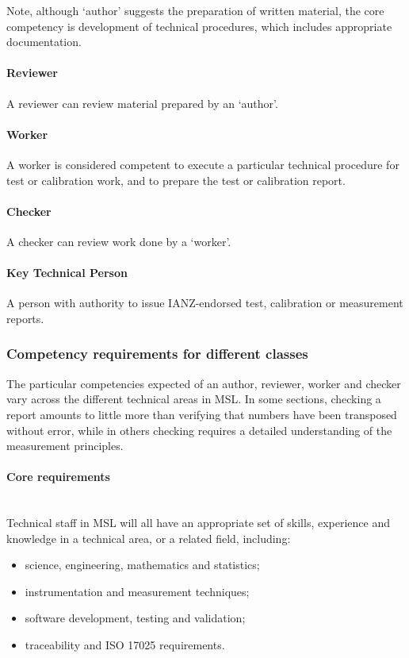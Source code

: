 Note, although ‘author' suggests the preparation of written material, the core competency is development of technical procedures, which includes appropriate documentation.

\paragraph{Reviewer}
A reviewer can review material prepared by an ‘author'. 

\paragraph{Worker}
A worker is considered competent to execute a particular technical procedure for test or calibration work, and to prepare the test or calibration report.

\paragraph{Checker}
A checker can review work done by a ‘worker'.

\paragraph{Key Technical Person}
A person with authority to issue IANZ-endorsed test, calibration or measurement reports.

\subsubsection{Competency requirements for different classes}
The particular competencies expected of an author, reviewer, worker and checker vary across the different technical areas in MSL. In some sections, checking a report amounts to little more than verifying that numbers have been transposed without error, while in others checking requires a detailed understanding of the measurement principles. 

\paragraph{Core requirements} \mbox{}\\
Technical staff in MSL will all have an appropriate set of skills, experience and knowledge in a technical area, or a related field, including:
\begin{itemize}
\item science, engineering, mathematics and statistics;
\item instrumentation and measurement techniques;
\item software development, testing and validation;
\item traceability and ISO 17025 requirements.
\end{itemize}
 
